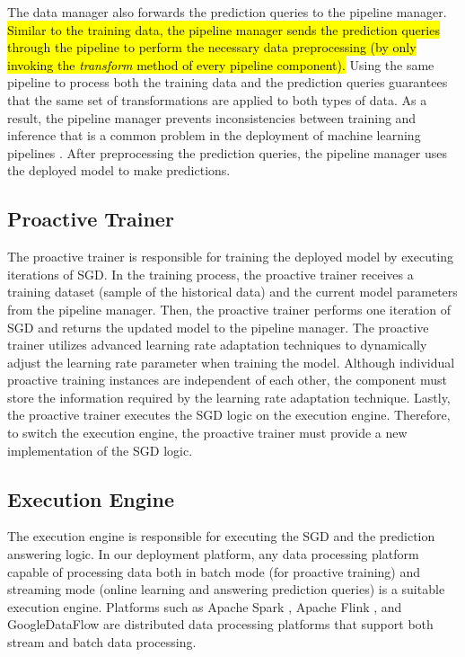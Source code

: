 The data manager also forwards the prediction queries to the pipeline manager.
\hl{Similar to the training data, the pipeline manager sends the prediction queries through the pipeline to perform the necessary data preprocessing (by only invoking the \textit{transform} method of every pipeline component).}
Using the same pipeline to process both the training data and the prediction queries guarantees that the same set of transformations are applied to both types of data.
As a result, the pipeline manager prevents inconsistencies between training and inference that is a common problem in the deployment of machine learning pipelines \cite{baylor2017tfx}.
After preprocessing the prediction queries, the pipeline manager uses the deployed model to make predictions.

\subsection{Proactive Trainer} 
The proactive trainer is responsible for training the deployed model by executing iterations of SGD.
In the training process, the proactive trainer receives a training dataset (sample of the historical data) and the current model parameters from the pipeline manager.
Then, the proactive trainer performs one iteration of SGD and returns the updated model to the pipeline manager.
The proactive trainer utilizes advanced learning rate adaptation techniques to dynamically adjust the learning rate parameter when training the model.
Although individual proactive training instances are independent of each other, the component must store the information required by the learning rate adaptation technique.
Lastly, the proactive trainer executes the SGD logic on the execution engine.
Therefore, to switch the execution engine, the proactive trainer must provide a new implementation of the SGD logic.

\subsection{Execution Engine}
The execution engine is responsible for executing the SGD and the prediction answering logic.
In our deployment platform, any data processing platform capable of processing data both in batch mode (for proactive training) and streaming mode (online learning and answering prediction queries) is a suitable execution engine.
Platforms such as Apache Spark \cite{zaharia2010spark}, Apache Flink \cite{carbone2015apache}, and GoogleDataFlow \cite{akidau2015dataflow} are distributed data processing platforms that support both stream and batch data processing.